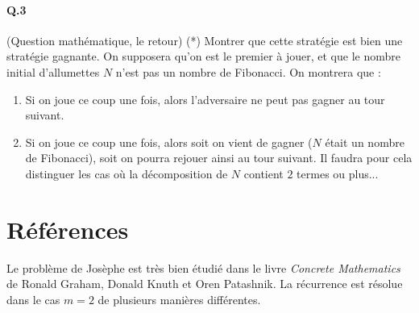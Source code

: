 \documentclass[10pt,a4paper]{article}
\begin{document}
\paragraph{Q.3} (Question mathématique, le retour) (*) Montrer que cette stratégie est bien une stratégie gagnante. On supposera qu'on est le premier à jouer, et que le nombre initial d'allumettes $N$ n'est pas un nombre de Fibonacci. On montrera que :
\begin{enumerate}
\item Si on joue ce coup une fois, alors l'adversaire ne peut pas gagner au tour suivant.
\item Si on joue ce coup une fois, alors soit on vient de gagner ($N$ était un nombre de Fibonacci), soit on pourra rejouer ainsi au tour suivant. Il faudra pour cela distinguer les cas où la décomposition de $N$ contient $2$ termes ou plus...
\end{enumerate}
\section{Références}
Le problème de Josèphe est très bien étudié dans le livre \emph{Concrete Mathematics} de Ronald Graham, Donald Knuth et Oren Patashnik. La récurrence est résolue dans le cas $m=2$ de plusieurs manières différentes.
\end{document}
